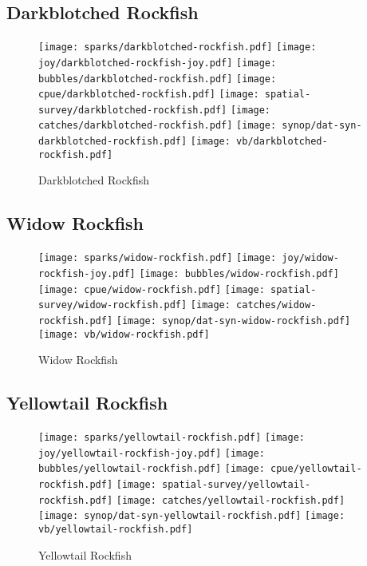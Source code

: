 \subsection*{Darkblotched Rockfish}

\begin{figure}[htbp]
\centering
\texttt{[image: sparks/darkblotched-rockfish.pdf]}
\texttt{[image: joy/darkblotched-rockfish-joy.pdf]}
\texttt{[image: bubbles/darkblotched-rockfish.pdf]}
\texttt{[image: cpue/darkblotched-rockfish.pdf]}
\texttt{[image: spatial-survey/darkblotched-rockfish.pdf]}
\texttt{[image: catches/darkblotched-rockfish.pdf]}
\texttt{[image: synop/dat-syn-darkblotched-rockfish.pdf]}
\texttt{[image: vb/darkblotched-rockfish.pdf]}
\caption{Darkblotched Rockfish}
\end{figure}
\clearpage
\subsection*{Widow Rockfish}

\begin{figure}[htbp]
\centering
\texttt{[image: sparks/widow-rockfish.pdf]}
\texttt{[image: joy/widow-rockfish-joy.pdf]}
\texttt{[image: bubbles/widow-rockfish.pdf]}
\texttt{[image: cpue/widow-rockfish.pdf]}
\texttt{[image: spatial-survey/widow-rockfish.pdf]}
\texttt{[image: catches/widow-rockfish.pdf]}
\texttt{[image: synop/dat-syn-widow-rockfish.pdf]}
\texttt{[image: vb/widow-rockfish.pdf]}
\caption{Widow Rockfish}
\end{figure}
\clearpage
\subsection*{Yellowtail Rockfish}

\begin{figure}[htbp]
\centering
\texttt{[image: sparks/yellowtail-rockfish.pdf]}
\texttt{[image: joy/yellowtail-rockfish-joy.pdf]}
\texttt{[image: bubbles/yellowtail-rockfish.pdf]}
\texttt{[image: cpue/yellowtail-rockfish.pdf]}
\texttt{[image: spatial-survey/yellowtail-rockfish.pdf]}
\texttt{[image: catches/yellowtail-rockfish.pdf]}
\texttt{[image: synop/dat-syn-yellowtail-rockfish.pdf]}
\texttt{[image: vb/yellowtail-rockfish.pdf]}
\caption{Yellowtail Rockfish}
\end{figure}
\clearpage
